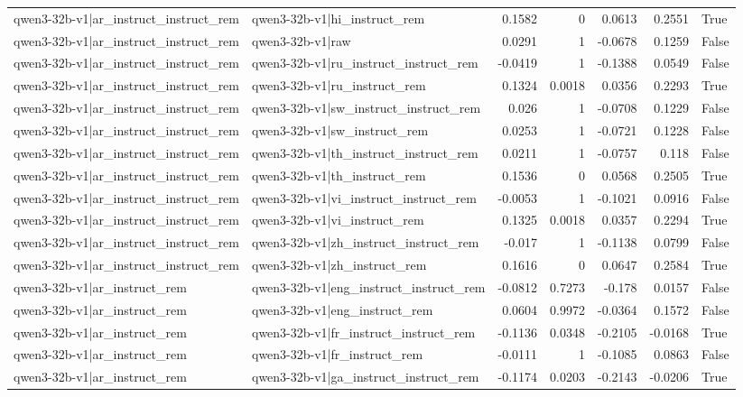 \begin{table}
\begin{tabular}{l l r r r r l}
qwen3-32b-v1|ar_instruct_instruct_rem & qwen3-32b-v1|hi_instruct_rem & 0.1582 & 0 & 0.0613 & 0.2551 & True \\
qwen3-32b-v1|ar_instruct_instruct_rem & qwen3-32b-v1|raw & 0.0291 & 1 & -0.0678 & 0.1259 & False \\
qwen3-32b-v1|ar_instruct_instruct_rem & qwen3-32b-v1|ru_instruct_instruct_rem & -0.0419 & 1 & -0.1388 & 0.0549 & False \\
qwen3-32b-v1|ar_instruct_instruct_rem & qwen3-32b-v1|ru_instruct_rem & 0.1324 & 0.0018 & 0.0356 & 0.2293 & True \\
qwen3-32b-v1|ar_instruct_instruct_rem & qwen3-32b-v1|sw_instruct_instruct_rem & 0.026 & 1 & -0.0708 & 0.1229 & False \\
qwen3-32b-v1|ar_instruct_instruct_rem & qwen3-32b-v1|sw_instruct_rem & 0.0253 & 1 & -0.0721 & 0.1228 & False \\
qwen3-32b-v1|ar_instruct_instruct_rem & qwen3-32b-v1|th_instruct_instruct_rem & 0.0211 & 1 & -0.0757 & 0.118 & False \\
qwen3-32b-v1|ar_instruct_instruct_rem & qwen3-32b-v1|th_instruct_rem & 0.1536 & 0 & 0.0568 & 0.2505 & True \\
qwen3-32b-v1|ar_instruct_instruct_rem & qwen3-32b-v1|vi_instruct_instruct_rem & -0.0053 & 1 & -0.1021 & 0.0916 & False \\
qwen3-32b-v1|ar_instruct_instruct_rem & qwen3-32b-v1|vi_instruct_rem & 0.1325 & 0.0018 & 0.0357 & 0.2294 & True \\
qwen3-32b-v1|ar_instruct_instruct_rem & qwen3-32b-v1|zh_instruct_instruct_rem & -0.017 & 1 & -0.1138 & 0.0799 & False \\
qwen3-32b-v1|ar_instruct_instruct_rem & qwen3-32b-v1|zh_instruct_rem & 0.1616 & 0 & 0.0647 & 0.2584 & True \\
qwen3-32b-v1|ar_instruct_rem & qwen3-32b-v1|eng_instruct_instruct_rem & -0.0812 & 0.7273 & -0.178 & 0.0157 & False \\
qwen3-32b-v1|ar_instruct_rem & qwen3-32b-v1|eng_instruct_rem & 0.0604 & 0.9972 & -0.0364 & 0.1572 & False \\
qwen3-32b-v1|ar_instruct_rem & qwen3-32b-v1|fr_instruct_instruct_rem & -0.1136 & 0.0348 & -0.2105 & -0.0168 & True \\
qwen3-32b-v1|ar_instruct_rem & qwen3-32b-v1|fr_instruct_rem & -0.0111 & 1 & -0.1085 & 0.0863 & False \\
qwen3-32b-v1|ar_instruct_rem & qwen3-32b-v1|ga_instruct_instruct_rem & -0.1174 & 0.0203 & -0.2143 & -0.0206 & True \\

\end{tabular}
\end{table}
